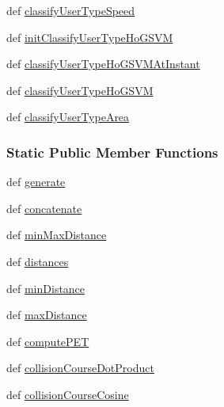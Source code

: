 \begin{DoxyCompactItemize}
def \hyperlink{classmoving_1_1MovingObject_a55eacbaf9483fc1b26079225079b8713}{classify\-User\-Type\-Speed}
\item 
def \hyperlink{classmoving_1_1MovingObject_a6cac8353066605307383fbebb2ad07b6}{init\-Classify\-User\-Type\-Ho\-G\-S\-V\-M}
\item 
def \hyperlink{classmoving_1_1MovingObject_a3c5b3b83b3854f211184ba7b113172f9}{classify\-User\-Type\-Ho\-G\-S\-V\-M\-At\-Instant}
\item 
def \hyperlink{classmoving_1_1MovingObject_ab6968b385f1c680030a23a26c46a5725}{classify\-User\-Type\-Ho\-G\-S\-V\-M}
\item 
def \hyperlink{classmoving_1_1MovingObject_a6fa5e07bb41a8c8d8d31d8059b9f43d4}{classify\-User\-Type\-Area}
\end{DoxyCompactItemize}
\subsubsection*{Static Public Member Functions}
\begin{DoxyCompactItemize}
\item 
def \hyperlink{classmoving_1_1MovingObject_aeee8f16c99b377c0d1b4fa1f4e321a1c}{generate}
\item 
def \hyperlink{classmoving_1_1MovingObject_aaa55660bfbfdf778b714f7b915947e93}{concatenate}
\item 
def \hyperlink{classmoving_1_1MovingObject_ab8c9203b44a17211bdcb41ec1d4a78b8}{min\-Max\-Distance}
\item 
def \hyperlink{classmoving_1_1MovingObject_a98dff92099bac9fd93779fa07f605f36}{distances}
\item 
def \hyperlink{classmoving_1_1MovingObject_a5386af60f864586a535978abe2353302}{min\-Distance}
\item 
def \hyperlink{classmoving_1_1MovingObject_a421db750d35abca7b07b70c9166677d5}{max\-Distance}
\item 
def \hyperlink{classmoving_1_1MovingObject_a2bfb4a35f6b50993c8e3fff36d39db0e}{compute\-P\-E\-T}
\item 
def \hyperlink{classmoving_1_1MovingObject_a347438cbdf8aa6f7e53108b7fc15a126}{collision\-Course\-Dot\-Product}
\item 
def \hyperlink{classmoving_1_1MovingObject_ac4c50f9830c66443fcdbd91d75d63e2b}{collision\-Course\-Cosine}
\end{DoxyCompactItemize}
